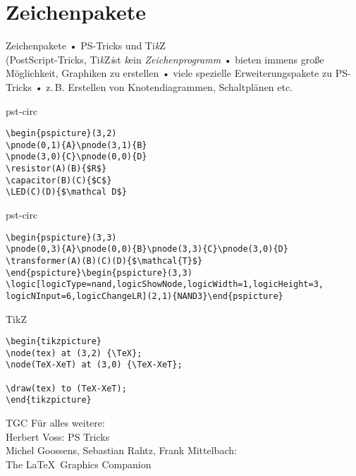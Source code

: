\section{Zeichenpakete}
\newcommand\TikZ{Ti\emph{k}Z\xspace}
\begin{frame}[fragile]{Zeichenpakete}
• PS-Tricks und \TikZ{}\\%
(PostScript-Tricks, \TikZ \emph{i}st \emph{k}ein \emph{Zeichenprogramm}
• bieten immens große Möglichkeit, Graphiken zu erstellen
• viele spezielle Erweiterungspakete zu PS-Tricks
• z.\,B. Erstellen von Knotendiagrammen, Schaltplänen etc. 
\•
\end{frame}

\begin{frame}[fragile]{pst-circ}
\begin{lstlisting}
\begin{pspicture}(3,2)
\pnode(0,1){A}\pnode(3,1){B}
\pnode(3,0){C}\pnode(0,0){D}
\resistor(A)(B){$R$}
\capacitor(B)(C){$C$}
\LED(C)(D){$\mathcal D$}
\end{lstlisting}
\end{frame}

\begin{frame}[fragile]{pst-circ}
\begin{lstlisting}
\begin{pspicture}(3,3)
\pnode(0,3){A}\pnode(0,0){B}\pnode(3,3){C}\pnode(3,0){D}
\transformer(A)(B)(C)(D){$\mathcal{T}$}
\end{pspicture}\begin{pspicture}(3,3)
\logic[logicType=nand,logicShowNode,logicWidth=1,logicHeight=3,
logicNInput=6,logicChangeLR](2,1){NAND3}\end{pspicture}
\end{lstlisting}
\end{frame}

\begin{frame}[fragile]{TikZ}
\begin{lstlisting}
\begin{tikzpicture}
\node(tex) at (3,2) {\TeX};
\node(TeX-XeT) at (3,0) {\TeX-XeT};

\draw(tex) to (TeX-XeT);
\end{tikzpicture}
\end{lstlisting}
\end{frame}

\begin{frame}{TGC}
Für alles weitere: \\
Herbert Voss: PS Tricks\\
Michel Goossens, Sebastian Rahtz, Frank Mittelbach:\\
The \LaTeX\ Graphics Companion
\end{frame}

